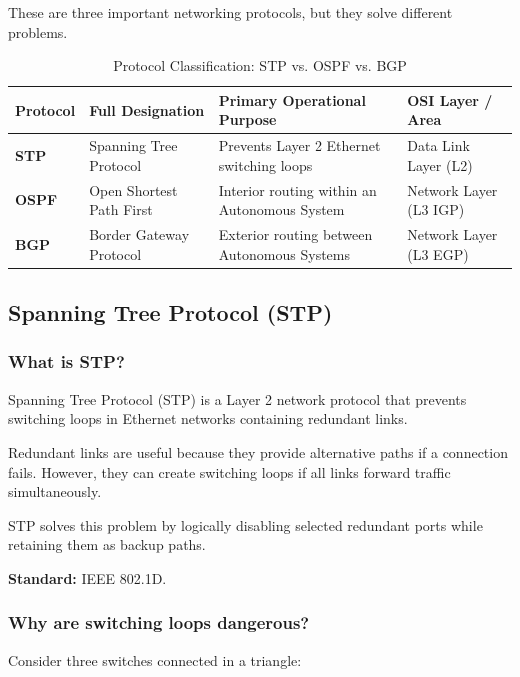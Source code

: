 These are three important networking protocols, but they solve different problems.


\begin{table}[htbp]
\centering
\caption{Protocol Classification: STP vs. OSPF vs. BGP}
\label{tab:stp_ospf_bgp_summary}
\begin{tabularx}{\textwidth}{p{2.2cm} p{3.8cm} X p{3.2cm}}
\toprule
\textbf{Protocol} & \textbf{Full Designation} & \textbf{Primary Operational Purpose} & \textbf{OSI Layer / Area} \\
\midrule
\textbf{STP} & Spanning Tree Protocol & Prevents Layer 2 Ethernet switching loops & Data Link Layer (L2) \\
\textbf{OSPF} & Open Shortest Path First & Interior routing within an Autonomous System & Network Layer (L3 IGP) \\
\textbf{BGP} & Border Gateway Protocol & Exterior routing between Autonomous Systems & Network Layer (L3 EGP) \\
\bottomrule
\end{tabularx}
\end{table}

\subsection{Spanning Tree Protocol (STP)}

\subsubsection{What is STP?}

Spanning Tree Protocol (STP) is a Layer 2 network protocol that prevents switching loops in Ethernet networks containing redundant links.

Redundant links are useful because they provide alternative paths if a connection fails. However, they can create switching loops if all links forward traffic simultaneously.

STP solves this problem by logically disabling selected redundant ports while retaining them as backup paths.

\textbf{Standard:} IEEE 802.1D.

\subsubsection{Why are switching loops dangerous?}

Consider three switches connected in a triangle:

